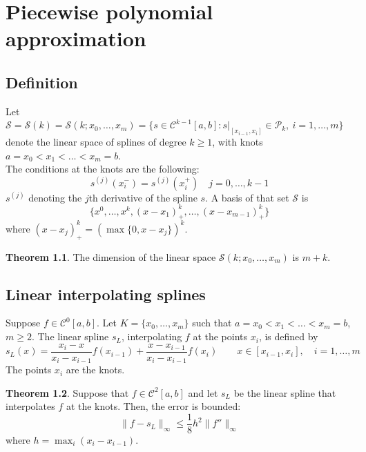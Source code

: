 \documentclass[12pt, openany]{report}
\theoremstyle{definition}
\newtheorem{thm}{Theorem}[chapter]
\begin{document}
\chapter{Piecewise polynomial approximation}
\section{Definition}
Let \(\mathcal{S}=\mathcal{S}(k)=\mathcal{S}(k;x_0,\dots,x_m)=\{s\in \mathcal{C}^{k-1}[a,b]:s|_{[x_{i-1},x_i]}\in \mathcal{P}_k,\: i=1,\dots,m\}\) denote the linear space of splines of degree \(k\ge 1\), with knots \(a=x_0<x_1<\dots <x_m=b\). \\
The conditions at the knots are the following:
\begin{equation}
    s^{(j)}(x_i^-) = s^{(j)}(x_i^+) \quad j=0,\dots, k-1
\end{equation}
\(s^{(j)}\) denoting the \(j\)th derivative of the spline \(s\).
A basis of that set \(\mathcal{S}\) is 
\begin{equation}
    \{x^0,\dots,x^k, (x-x_1)_+^k,\dots,(x-x_{m-1})^k_+\}
\end{equation}
where \((x-x_j)_+^k = (\max \{0,x-x_j\})^k\). \\
\begin{thm}
    The dimension of the linear space \(\mathcal{S}(k;x_0,\dots,x_m)\) is \(m+k\).
\end{thm}
\section{Linear interpolating splines}
Suppose $f\in \mathcal{C}^0[a,b]$. Let $K=\{x_0,\dots,x_m\}$ such that $a = x_0<x_1<\dots<x_m=b$, $m\ge2$. The linear spline $s_L$, interpolating $f$ at the points $x_i$, is defined by 
\begin{equation}
    s_L(x) = \frac{x_i-x}{x_i-x_{i-1}}f(x_{i-1}) + \frac{x-x_{i-1}}{x_i-x_{i-1}}f(x_i) \qquad x\in [x_{i-1},x_i], \quad i=1,\dots,m
\end{equation}
The points $x_i$ are the knots. 
\begin{thm}
    Suppose that $f\in \mathcal{C}^2[a,b]$ and let $s_L$ be the linear spline that interpolates $f$ at the knots. Then, the error is bounded:
    \begin{equation}
        \lVert f-s_L\rVert_{\infty} \le \frac{1}{8} h^2 \lVert f''\rVert_{\infty}
    \end{equation}
    where $h=\max_i (x_i-x_{i-1})$. 
\end{thm}
\end{document}
